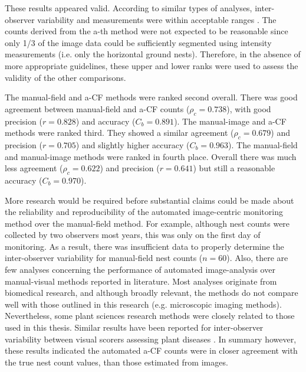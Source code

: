 These results appeared valid. According to similar types of analyses, inter-observer variability and measurements were within acceptable ranges \cite{Stewart2014,Bock2008}. The counts derived from the a-th method were not expected to be reasonable since only 1/3 of the image data could be sufficiently segmented using intensity measurements (i.e. only the horizontal ground nests). Therefore, in the absence of more appropriate guidelines, these upper and lower ranks were used to assess the validity of the other comparisons. 

The manual-field and a-CF methods were ranked second overall. There was good agreement between manual-field and a-CF counts ($\rho_{c} = 0.738$), with good precision ($r = 0.828$) and accuracy ($C_{b} = 0.891$). The manual-image and a-CF methods were ranked third. They showed a similar agreement ($\rho_{c} = 0.679$) and precision ($r = 0.705$) and slightly higher accuracy ($C_{b} = 0.963$). The manual-field and manual-image methods were ranked in fourth place. Overall there was much less agreement ($\rho_{c} = 0.622$) and precision ($r = 0.641$) but still a reasonable accuracy ($C_{b} = 0.970$). 

More research would be required before substantial claims could be made about the reliability and reproducibility of the automated image-centric monitoring method over the manual-field method. For example, although nest counts were collected by two observers most years, this was only on the first day of monitoring. As a result, there was insufficient data to properly determine the inter-observer variability for manual-field nest counts ($n = 60$). Also, there are few analyses concerning the performance of automated image-analysis over manual-visual methods reported in literature. Most analyses originate from biomedical research, and although broadly relevant, the methods do not compare well with those outlined in this research (e.g. microscopic imaging methods). Nevertheless, some plant sciences research methods were closely related to those used in this thesis. Similar results have been reported for inter-observer variability between visual scorers assessing plant diseases \cite{Stewart2014}. In summary however, these results indicated the automated a-CF counts were in closer agreement with the true nest count values, than those estimated from images.


